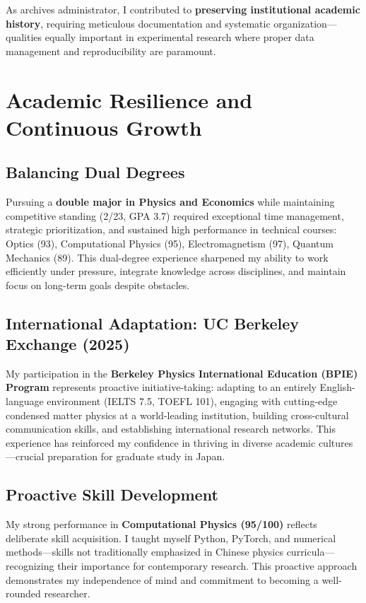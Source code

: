 \documentclass[11pt,a4paper]{article}
\begin{document}
As archives administrator, I contributed to \textbf{preserving institutional academic history}, requiring meticulous documentation and systematic organization—qualities equally important in experimental research where proper data management and reproducibility are paramount.

\section{Academic Resilience and Continuous Growth}

\subsection{Balancing Dual Degrees}

Pursuing a \textbf{double major in Physics and Economics} while maintaining competitive standing (2/23, GPA 3.7) required exceptional time management, strategic prioritization, and sustained high performance in technical courses: Optics (93), Computational Physics (95), Electromagnetism (97), Quantum Mechanics (89). This dual-degree experience sharpened my ability to work efficiently under pressure, integrate knowledge across disciplines, and maintain focus on long-term goals despite obstacles.

\subsection{International Adaptation: UC Berkeley Exchange (2025)}

My participation in the \textbf{Berkeley Physics International Education (BPIE) Program} represents proactive initiative-taking: adapting to an entirely English-language environment (IELTS 7.5, TOEFL 101), engaging with cutting-edge condensed matter physics at a world-leading institution, building cross-cultural communication skills, and establishing international research networks. This experience has reinforced my confidence in thriving in diverse academic cultures—crucial preparation for graduate study in Japan.

\subsection{Proactive Skill Development}

My strong performance in \textbf{Computational Physics (95/100)} reflects deliberate skill acquisition. I taught myself Python, PyTorch, and numerical methods—skills not traditionally emphasized in Chinese physics curricula—recognizing their importance for contemporary research. This proactive approach demonstrates my independence of mind and commitment to becoming a well-rounded researcher.
\end{document}
